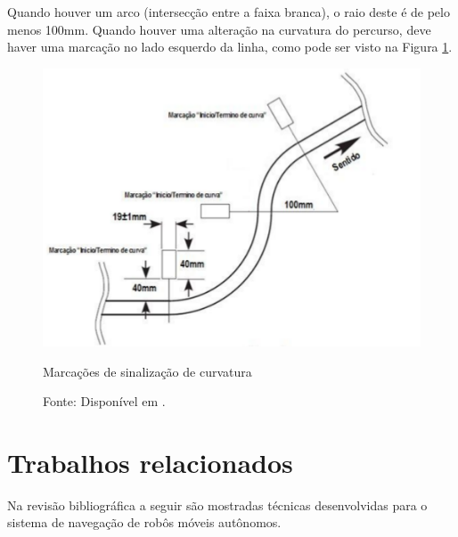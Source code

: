 Quando houver um arco (intersecção entre a faixa branca), o raio deste é de pelo menos 100mm. Quando houver uma 
alteração na curvatura do percurso, deve haver uma marcação no lado esquerdo da linha, como pode ser visto na Figura 
\ref{fig:percurso4}.\par

\begin{figure}[t!]
 \centering
 \captionsetup{width=0.68\textwidth,font=footnotesize,textfont=bf}
 \includegraphics[scale=0.6]{figuras/Percurso4.png}
 \caption{Marcações de sinalização de curvatura \label{fig:percurso4}}
 \vspace{-0.3cm}
 \caption*{Fonte: Disponível em \cite[p.4]{RegrasRobocore}.}
\end{figure}





\vspace{1cm}
\section{Trabalhos relacionados} \label{cap:trabRel}

Na revisão bibliográfica a seguir são mostradas técnicas desenvolvidas para o sistema de navegação de robôs móveis autônomos.

